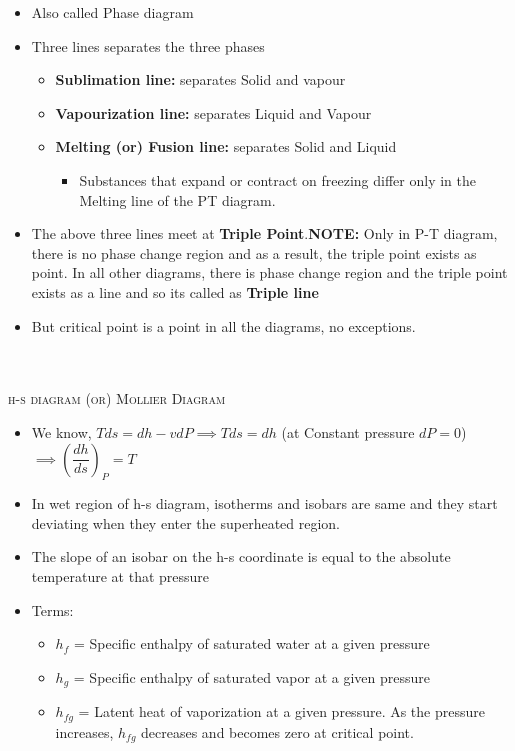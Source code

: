 \documentclass[8pt]{article}
\begin{document}
	\begin{itemize}
		\item Also called Phase diagram
		\item Three lines separates the three phases
			\begin{itemize}
				\item \textbf{Sublimation line: }separates Solid and vapour
				\item \textbf{Vapourization line: }separates Liquid and Vapour
				\item \textbf{Melting (or) Fusion line: }separates Solid and Liquid
					\begin{itemize}
						\item Substances that expand or contract on freezing differ only in the Melting line of the PT diagram.
					\end{itemize}
			\end{itemize}
		\item The above three lines meet at \textbf{Triple Point}.\textbf{NOTE: } Only in P-T diagram, there is no phase change region and as a result, the triple point exists as point. In all other diagrams, there is phase change region and the triple point exists as a line and so its called as \textbf{Triple line}
		\item But critical point is a point in all the diagrams, no exceptions. 
		\end{itemize}\hrulefill\\\\
\textsc{h-s diagram (or) Mollier Diagram}
	\begin{itemize}
		\item We know, $Tds = dh - vdP \implies Tds = dh$ (at Constant pressure $dP=0$) $\implies \boxed{\left(\dfrac{dh}{ds}\right)_{P} = T}$
		\item In wet region of h-s diagram, isotherms and isobars are same and they start deviating when they enter the superheated region. 
		\item The slope of an isobar on the h-s coordinate is equal to the absolute temperature at that pressure
		\item Terms:
			\begin{itemize}
				\item $h_f$ = Specific enthalpy of saturated water at a given pressure
				\item $h_g$ = Specific enthalpy of saturated vapor at a given pressure
				\item $h_{fg}$ = Latent heat of vaporization at a given pressure. As the pressure increases, $h_{fg}$ decreases and becomes zero at critical point.
			\end{itemize}
	\end{itemize}\hrulefill\\\\
\end{document}
